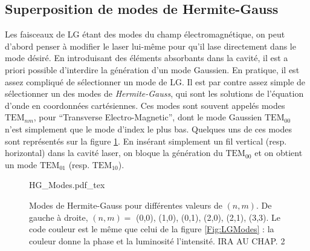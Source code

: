 \subsection{Superposition de modes de Hermite-Gauss}
\label{sec:hg_modes}
Les faisceaux de LG étant des modes du champ électromagnétique, on peut d'abord penser à modifier le laser lui-même pour qu'il lase directement dans le mode désiré. En introduisant des éléments absorbants dans la cavité, il est a priori possible d'interdire la génération d'un mode Gaussien. En pratique, il est assez compliqué de sélectionner un mode de LG. Il est par contre assez simple de sélectionner un des modes de \textit{Hermite-Gauss}, qui sont les solutions de l'équation d'onde en coordonnées cartésiennes. Ces modes sont souvent appelés modes $\mbox{TEM}_{nm}$, pour ``Transverse Electro-Magnetic'', dont le mode Gaussien $\mbox{TEM}_{00}$ n'est simplement que le mode d'index le plus bas. Quelques uns de ces modes sont représentés sur la figure \ref{Fig:hgmodes}. En insérant simplement un fil vertical (resp. horizontal) dans la cavité laser, on bloque la génération du $\mbox{TEM}_{00}$ et on obtient un mode $\mbox{TEM}_{01}$ (resp. $\mbox{TEM}_{10}$).

\begin{figure}[!ht]
\centering
\def\svgwidth{\columnwidth}
{HG_Modes.pdf_tex}
\caption{Modes de Hermite-Gauss pour différentes valeurs de $(n,m)$. De gauche à droite, $(n,m) =$ (0,0), (1,0), (0,1), (2,0), (2,1), (3,3). Le code couleur est le même que celui de la figure \ref{Fig:LGModes} : la couleur donne la phase et la luminosité l'intensité. \textcolor[rgb]{1,0,0}{IRA AU CHAP. 2}}
\label{Fig:hgmodes}
\end{figure}

